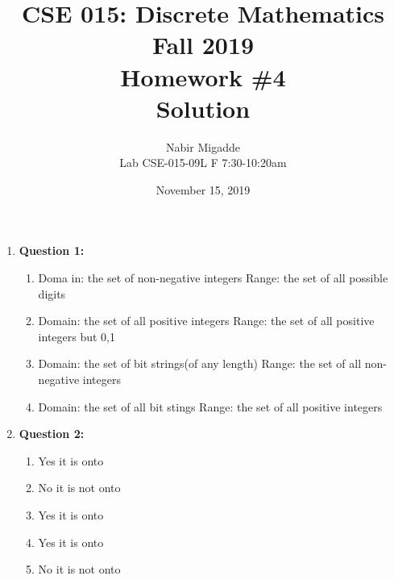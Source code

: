 \documentclass[11pt]{article}
\begin{document}
\author{Nabir Migadde\\
Lab CSE-015-09L F 7:30-10:20am}

\title{CSE 015: Discrete Mathematics\\
Fall 2019\\
Homework \#4\\
Solution}

\date{November 15, 2019}
\maketitle

\begin{enumerate}

\item
\textbf{Question 1:}
\begin{enumerate}[label=(\alph*)]
\item
Doma
in: the set of non-negative integers Range: the set of all possible digits

\item
Domain: the set of all positive integers Range: the set of all positive integers but 0,1

\item
Domain: the set of bit strings(of any length) Range: the set of all non-negative integers

\item
Domain: the set of all bit stings Range: the set of all positive integers

\end{enumerate}

\item
\textbf{Question 2:}

\begin{enumerate}[label=(\alph*)]
\item
Yes it is onto

\item
No it is not onto

\item
Yes it is onto

\item
Yes it is onto

\item
No it is not onto

\end{enumerate}


\end{enumerate}
\end{document}
